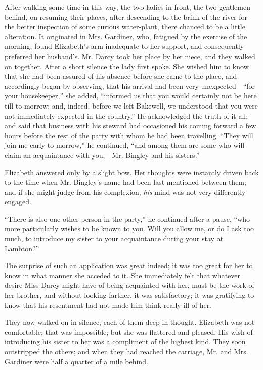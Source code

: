 After walking some time in this way, the two ladies in front, the two gentlemen behind, on resuming their places, after descending to the brink of the river for the better inspection of some curious water-plant, there chanced to be a little alteration. It originated in Mrs. Gardiner, who, fatigued by the exercise of the morning, found Elizabeth's arm inadequate to her support, and consequently preferred her husband's. Mr. Darcy took her place by her niece, and they walked on together. After a short silence the lady first spoke. She wished him to know that she had been assured of his absence before she came to the place, and accordingly began by observing, that his arrival had been very unexpected---``for your housekeeper,'' she added, ``informed us that you would certainly not be here till to-morrow; and, indeed, before we left Bakewell, we understood that you were not immediately expected in the country.'' He acknowledged the truth of it all; and said that business with his steward had occasioned his coming forward a few hours before the rest of the party with whom he had been travelling. ``They will join me early to-morrow,'' he continued, ``and among them are some who will claim an acquaintance with you,---Mr. Bingley and his sisters.''

Elizabeth answered only by a slight bow. Her thoughts were instantly driven back to the time when Mr. Bingley's name had been last mentioned between them; and if she might judge from his complexion, \textit{his} mind was not very differently engaged.

``There is also one other person in the party,'' he continued after a pause, ``who more particularly wishes to be known to you. Will you allow me, or do I ask too much, to introduce my sister to your acquaintance during your stay at Lambton?''

The surprise of such an application was great indeed; it was too great for her to know in what manner she acceded to it. She immediately felt that whatever desire Miss Darcy might have of being acquainted with her, must be the work of her brother, and without looking farther, it was satisfactory; it was gratifying to know that his resentment had not made him think really ill of her.

They now walked on in silence; each of them deep in thought. Elizabeth was not comfortable; that was impossible; but she was flattered and pleased. His wish of introducing his sister to her was a compliment of the highest kind. They soon outstripped the others; and when they had reached the carriage, Mr. and Mrs. Gardiner were half a quarter of a mile behind.

